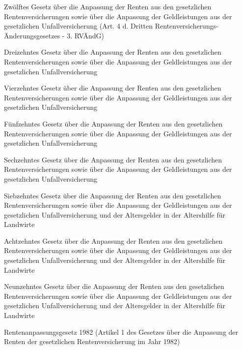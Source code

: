 \item[{RAG-12}] Zwölftes Gesetz über die Anpassung der Renten aus den gesetzlichen Rentenversicherungen sowie über die Anpassung der Geldleistungen aus der gesetzlichen Unfallversicherung (Art. 4 d. Dritten Rentenversicherungs- Änderungsgesetzes - 3. RVÄndG)

\item[{RAG-13}] Dreizehntes Gesetz über die Anpassung der Renten aus den gesetzlichen Rentenversicherungen sowie über die Anpassung der Geldleistungen aus der gesetzlichen Unfallversicherung

\item[{RAG-14}] Vierzehntes Gesetz über die Anpassung der Renten aus den gesetzlichen Rentenversicherungen sowie über die Anpassung der Geldleistungen aus der gesetzlichen Unfallversicherung

\item[{RAG-15}] Fünfzehntes Gesetz über die Anpassung der Renten aus den gesetzlichen Rentenversicherungen sowie über die Anpassung der Geldleistungen aus der gesetzlichen Unfallversicherung

\item[{RAG-16}] Sechzehntes Gesetz über die Anpassung der Renten aus den gesetzlichen Rentenversicherungen sowie über die Anpassung der Geldleistungen aus der gesetzlichen Unfallversicherung

\item[{RAG-17}] Siebzehntes Gesetz über die Anpassung der Renten aus den gesetzlichen Rentenversicherungen sowie über die Anpassung der Geldleistungen aus der gesetzlichen Unfallversicherung und der Altersgelder in der Altershilfe für Landwirte

\item[{RAG-18}] Achtzehntes Gesetz über die Anpassung der Renten aus den gesetzlichen Rentenversicherungen sowie über die Anpassung der Geldleistungen aus der gesetzlichen Unfallversicherung und der Altersgelder in der Altershilfe für Landwirte

\item[{RAG-19}] Neunzehntes Gesetz über die Anpassung der Renten aus den gesetzlichen Rentenversicherungen sowie über die Anpassung der Geldleistungen aus der gesetzlichen Unfallversicherung und der Altersgelder in der Altershilfe für Landwirte

\item[{RAG-1982}] Rentenanpassungsgesetz 1982 (Artikel 1 des Gesetzes über die Anpassung der Renten der gesetzlichen Rentenversicherung im Jahr 1982)

